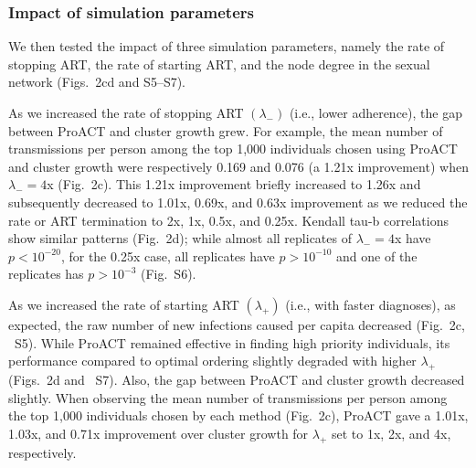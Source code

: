 \documentclass[a4paper,11pt]{article}
\begin{document}
\subsubsection{Impact of simulation parameters}
We then tested the impact of three simulation parameters, namely the rate of stopping ART, the rate of starting ART, and the node degree in the sexual network (Figs.~2cd and S5--S7).

As we increased the rate of stopping ART $\left(\lambda_{-}\right)$ (i.e., lower adherence), the gap between ProACT and cluster growth grew.
For example, the mean number of transmissions per person among the top 1,000 individuals chosen using ProACT and cluster growth were respectively 0.169 and 0.076 (a 1.21x improvement) when $\lambda_-=4$x (Fig.~2c). 
This 1.21x improvement briefly increased to 1.26x and subsequently decreased to 1.01x, 0.69x, and 0.63x improvement as we reduced the rate or ART termination to 2x, 1x, 0.5x, and 0.25x.
Kendall tau-b correlations show similar patterns (Fig.~2d);
while almost all replicates of $\lambda_-=4$x have $p<10^{-20}$, for the 0.25x case, all replicates have $p>10^{-10}$ and one of the replicates has $p>10^{-3}$  (Fig.~S6).
    






As we increased the rate of starting ART $\left(\lambda_{+}\right)$ (i.e., with faster diagnoses), as expected, the raw number of new infections caused per capita  decreased (Fig.~2c, ~S5).
While ProACT remained effective in finding high priority individuals,
its performance compared to optimal ordering slightly degraded with higher $\lambda_{+}$ (Figs.~2d and ~S7).
Also, the gap between ProACT and cluster growth decreased slightly.
When observing the mean number of transmissions per person among the top 1,000 individuals chosen by each method (Fig.~2c),
ProACT gave a 1.01x, 1.03x, and 0.71x improvement over cluster growth for $\lambda_{+}$ set to 1x, 2x, and 4x, respectively.
\end{document}
